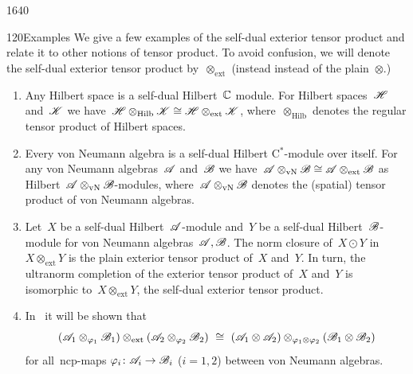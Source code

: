\begin{parsec}{1640}
\begin{point}{120}{Examples}%
We give a few examples of the self-dual exterior tensor product
    and relate it to other notions of tensor product.
To avoid confusion, we will denote the self-dual exterior
    tensor product by~$\otimes_{\text{ext}}$
    (instead instead of the plain~$\otimes$.)
\begin{enumerate}
\item
Any Hilbert space is a self-dual Hilbert~$\mathbb{C}$ module.
For Hilbert spaces~$\mathscr{H}$ and~$\mathscr{K}$
    we have~$\mathscr{H} \otimes_{\text{Hilb}} \mathscr{K}
        \cong \mathscr{H} \otimes_{\text{ext}} \mathscr{K}$,
    where~$\otimes_{\text{Hilb}}$ denotes the regular tensor product of
    Hilbert spaces.
\item
Every von Neumann algebra is a self-dual Hilbert C$^*$-module
    over itself.
For any von Neumann algebras~$\mathscr{A}$ and~$\mathscr{B}$
    we have~$\mathscr{A}\otimes_{\text{vN}} \mathscr{B}
        \cong \mathscr{A} \otimes_{\text{ext}} \mathscr{B}$
        as Hilbert~$\mathscr{A}\otimes_{\text{vN}} \mathscr{B}$-modules,
        where~$\mathscr{A}\otimes_{\text{vN}}\mathscr{B}$ denotes the (spatial)
        tensor product of von Neumann algebras.
\item
Let~$X$ be a self-dual Hilbert~$\mathscr{A}$-module
    and~$Y$ be a self-dual Hilbert~$\mathscr{B}$-module
        for von Neumann algebras~$\mathscr{A},\mathscr{B}$.
The norm closure of~$X\odot Y$
    in~$X \otimes_{\text{ext}} Y$
        is the plain exterior tensor product of~$X$ and~$Y$.
In turn, the ultranorm completion of the exterior tensor product
    of~$X$ and~$Y$ is isomorphic to~$X \otimes_{\text{ext}} Y$,
        the self-dual exterior tensor product.
\item
In~ it will be shown that
\begin{equation*}
(\scrA_1 \otimes_{\varphi_1} \scrB_1)
    \otimes_{\text{ext}} (\scrA_2 \otimes_{\varphi_2} \scrB_2)
\ \cong \ 
(\scrA_1 \otimes \scrA_2) \otimes_{\varphi_1\otimes \varphi_2} (\scrB_1 \otimes \scrB_2)
\end{equation*}
        for all~ncp-maps $\varphi_i\colon \mathscr{A}_i \to \mathscr{B}_i$ ($i=1,2$)
    between von Neumann algebras.
\end{enumerate}
\spacingfix{}
\end{point}
\end{parsec}
